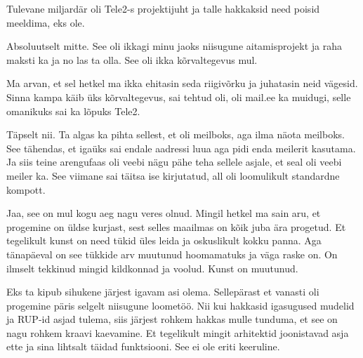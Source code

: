 Tulevane miljardär oli Tele2-s projektijuht ja talle hakkaksid need poisid meeldima, eks ole. 


Absoluutselt mitte. See oli ikkagi minu jaoks niisugune aitamisprojekt ja raha maksti ka ja no las ta olla. See  oli ikka  kõrvaltegevus mul.


Ma arvan, et sel hetkel ma ikka ehitasin seda riigivõrku ja juhatasin neid vägesid. Sinna kampa käib üks  kõrvaltegevus, sai tehtud oli, oli mail.ee ka muidugi, selle omanikuks sai ka lõpuks Tele2. 



Täpselt nii. Ta algas ka pihta sellest, et oli meilboks, aga ilma näota meilboks. See tähendas, et igaüks sai endale aadressi luua aga  pidi  enda meilerit  kasutama. Ja siis teine arengufaas oli veebi nägu pähe teha sellele  asjale, et seal oli veebi meiler ka. See viimane sai täitsa ise kirjutatud, all oli loomulikult standardne kompott. 


Jaa, see on mul kogu aeg nagu veres olnud. Mingil hetkel ma sain aru, et  progemine  on üldse kurjast, sest selles maailmas on kõik juba ära progetud. Et tegelikult  kunst on need tükid üles leida ja oskuslikult kokku panna. Aga tänapäeval on see tükkide arv muutunud hoomamatuks ja väga raske on.  On ilmselt tekkinud mingid kildkonnad ja voolud. Kunst on muutunud.


Eks ta kipub sihukene järjest igavam asi olema. Sellepärast et vanasti oli progemine päris selgelt  niisugune loometöö. Nii kui hakkasid igasugused mudelid ja RUP-id asjad tulema, siis järjest rohkem hakkas mulle tunduma, et see on nagu rohkem kraavi kaevamine. Et tegelikult mingit arhitektid joonistavad asja ette ja sina lihtsalt täidad funktsiooni. See ei ole eriti keeruline. 

